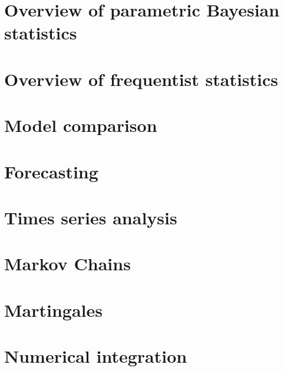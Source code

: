 \documentclass[12pt]{report}
\theoremstyle{definition}
\begin{document}
\chapter{Overview of parametric Bayesian statistics}
\label{chap:bayesian-overview}

\chapter{Overview of frequentist statistics}
\label{chap:frequentist-statistics}

\chapter{Model comparison}
\label{chap:model-comparison}

\chapter{Forecasting}
\label{chap:forecasting}

\chapter{Times series analysis}
\label{chap:time-series-analysis}

\chapter{Markov Chains}
\label{chap:markov-chains}

\chapter{Martingales}
\label{chap:martingales}

\chapter{Numerical integration}
\label{chap:numerical-integration}

\end{document}
